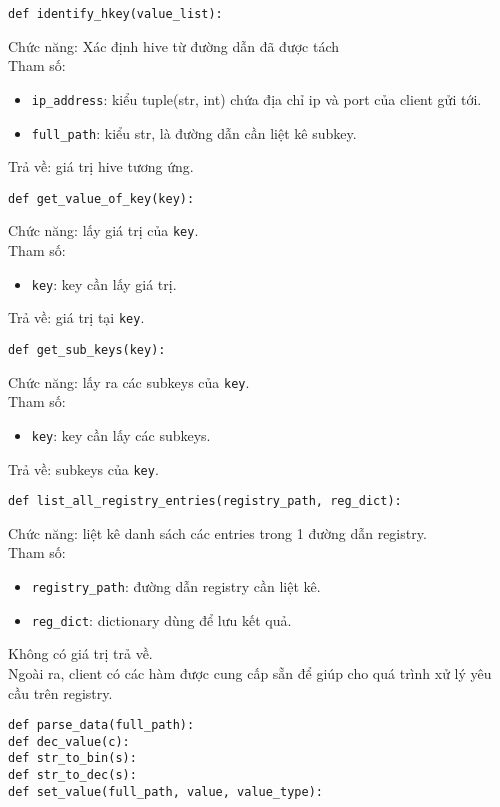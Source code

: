 \begin{itemize}
\begin{lstlisting}
def identify_hkey(value_list):
\end{lstlisting}
Chức năng: Xác định hive từ đường dẫn đã được tách\\
Tham số: 
\begin{itemize}
\item \lstinline{ip_address}: kiểu tuple(str, int) chứa địa chỉ ip và port của client gửi tới.
\item \lstinline{full_path}: kiểu str, là đường dẫn cần liệt kê subkey.
\end{itemize}
Trả về: giá trị hive tương ứng.

\begin{lstlisting}
def get_value_of_key(key):
\end{lstlisting}
Chức năng: lấy giá trị của \lstinline{key}.\\
Tham số: 
\begin{itemize}
\item \lstinline{key}: key cần lấy giá trị.
\end{itemize}
Trả về: giá trị tại \lstinline{key}.

\begin{lstlisting}
def get_sub_keys(key):
\end{lstlisting}
Chức năng: lấy ra các subkeys của \lstinline{key}.\\
Tham số: 
\begin{itemize}
\item \lstinline{key}: key cần lấy các subkeys.
\end{itemize}
Trả về: subkeys của \lstinline{key}.

\begin{lstlisting}
def list_all_registry_entries(registry_path, reg_dict):
\end{lstlisting}
Chức năng: liệt kê danh sách các entries trong 1 đường dẫn registry.\\
Tham số: 
\begin{itemize}
\item \lstinline{registry_path}: đường dẫn registry cần liệt kê.
\item \lstinline{reg_dict}: dictionary dùng để lưu kết quả.
\end{itemize}
Không có giá trị trả về.\\
Ngoài ra, client có các hàm được cung cấp sẵn để giúp cho quá trình xử lý yêu cầu trên registry.
\begin{lstlisting}
def parse_data(full_path):
def dec_value(c):
def str_to_bin(s):
def str_to_dec(s):
def set_value(full_path, value, value_type):
\end{lstlisting}

\end{itemize}

